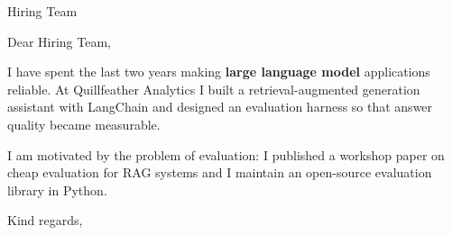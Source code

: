 \documentclass{letter}
\begin{document}
\begin{letter}{Hiring Team}
\opening{Dear Hiring Team,}

I have spent the last two years making \textbf{large language model} applications reliable.
At Quillfeather Analytics I built a retrieval-augmented generation assistant with LangChain and designed an evaluation harness so that answer quality became measurable.

I am motivated by the problem of evaluation: I published a workshop paper on cheap evaluation for RAG systems and I maintain an open-source evaluation library in Python.

\closing{Kind regards,}
\end{letter}
\end{document}
